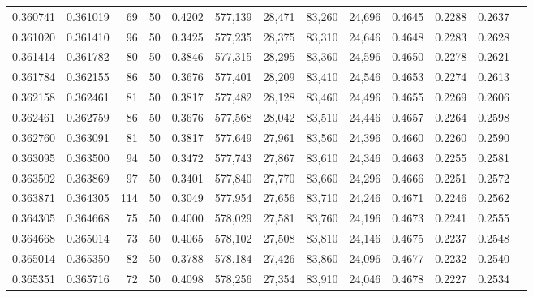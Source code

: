 \begin{tabular}{rrrrrrrrrrrrr}
0.360741 & 0.361019 &    69 &  50 &                                     0.4202 & 577,139 &  28,471 &  83,260 &  24,696 & 0.4645 & 0.2288 & 0.2637 \\
0.361020 & 0.361410 &    96 &  50 &                                     0.3425 & 577,235 &  28,375 &  83,310 &  24,646 & 0.4648 & 0.2283 & 0.2628 \\
0.361414 & 0.361782 &    80 &  50 &                                     0.3846 & 577,315 &  28,295 &  83,360 &  24,596 & 0.4650 & 0.2278 & 0.2621 \\
0.361784 & 0.362155 &    86 &  50 &                                     0.3676 & 577,401 &  28,209 &  83,410 &  24,546 & 0.4653 & 0.2274 & 0.2613 \\
0.362158 & 0.362461 &    81 &  50 &                                     0.3817 & 577,482 &  28,128 &  83,460 &  24,496 & 0.4655 & 0.2269 & 0.2606 \\
0.362461 & 0.362759 &    86 &  50 &                                     0.3676 & 577,568 &  28,042 &  83,510 &  24,446 & 0.4657 & 0.2264 & 0.2598 \\
0.362760 & 0.363091 &    81 &  50 &                                     0.3817 & 577,649 &  27,961 &  83,560 &  24,396 & 0.4660 & 0.2260 & 0.2590 \\
0.363095 & 0.363500 &    94 &  50 &                                     0.3472 & 577,743 &  27,867 &  83,610 &  24,346 & 0.4663 & 0.2255 & 0.2581 \\
0.363502 & 0.363869 &    97 &  50 &                                     0.3401 & 577,840 &  27,770 &  83,660 &  24,296 & 0.4666 & 0.2251 & 0.2572 \\
0.363871 & 0.364305 &   114 &  50 &                                     0.3049 & 577,954 &  27,656 &  83,710 &  24,246 & 0.4671 & 0.2246 & 0.2562 \\
0.364305 & 0.364668 &    75 &  50 &                                     0.4000 & 578,029 &  27,581 &  83,760 &  24,196 & 0.4673 & 0.2241 & 0.2555 \\
0.364668 & 0.365014 &    73 &  50 &                                     0.4065 & 578,102 &  27,508 &  83,810 &  24,146 & 0.4675 & 0.2237 & 0.2548 \\
0.365014 & 0.365350 &    82 &  50 &                                     0.3788 & 578,184 &  27,426 &  83,860 &  24,096 & 0.4677 & 0.2232 & 0.2540 \\
0.365351 & 0.365716 &    72 &  50 &                                     0.4098 & 578,256 &  27,354 &  83,910 &  24,046 & 0.4678 & 0.2227 & 0.2534 \\

\end{tabular}
